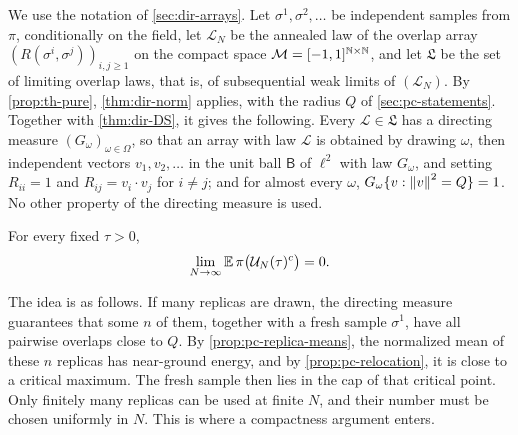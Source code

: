 We use the notation of \cref{sec:dir-arrays}. Let $\sigma^1,\sigma^2,\dots$ be independent samples from $\pi$, conditionally on the field, let $\mathcal L_N$ be the annealed law of the overlap array $(R(\sigma^i,\sigma^j))_{i,j\ge1}$ on the compact space $\mathcal M=[-1,1]^{\mathbb N\times\mathbb N}$, and let $\mathfrak L$ be the set of limiting overlap laws, that is, of subsequential weak limits of $(\mathcal L_N)$. By \cref{prop:th-pure}, \cref{thm:dir-norm} applies, with the radius $Q$ of \cref{sec:pc-statements}. Together with \cref{thm:dir-DS}, it gives the following. Every $\mathcal L\in\mathfrak L$ has a directing measure $(G_\omega)_{\omega\in\Omega}$, so that an array with law $\mathcal L$ is obtained by drawing $\omega$, then independent vectors $v_1,v_2,\dots$ in the unit ball $\mathsf B$ of $\ell^2$ with law $G_\omega$, and setting $R_{ii}=1$ and $R_{ij}=v_i\cdot v_j$ for $i\ne j$; and for almost every $\omega$, $G_\omega\{v:\left\lVert v\right\rVert^2=Q\}=1$. No other property of the directing measure is used.

\begin{proposition}\label{prop:pc-coarse}
For every fixed $\tau>0$,
\begin{equation}\label{eq:pc-coarse}
\lim_{N\to\infty}\mathbb E\,\pi\bigl(\mathcal U_N(\tau)^c\bigr)=0.
\end{equation}
\end{proposition}

The idea is as follows. If many replicas are drawn, the directing measure guarantees that some $n$ of them, together with a fresh sample $\sigma^1$, have all pairwise overlaps close to $Q$. By \cref{prop:pc-replica-means}, the normalized mean of these $n$ replicas has near-ground energy, and by \cref{prop:pc-relocation}, it is close to a critical maximum. The fresh sample then lies in the cap of that critical point. Only finitely many replicas can be used at finite $N$, and their number must be chosen uniformly in $N$. This is where a compactness argument enters.

